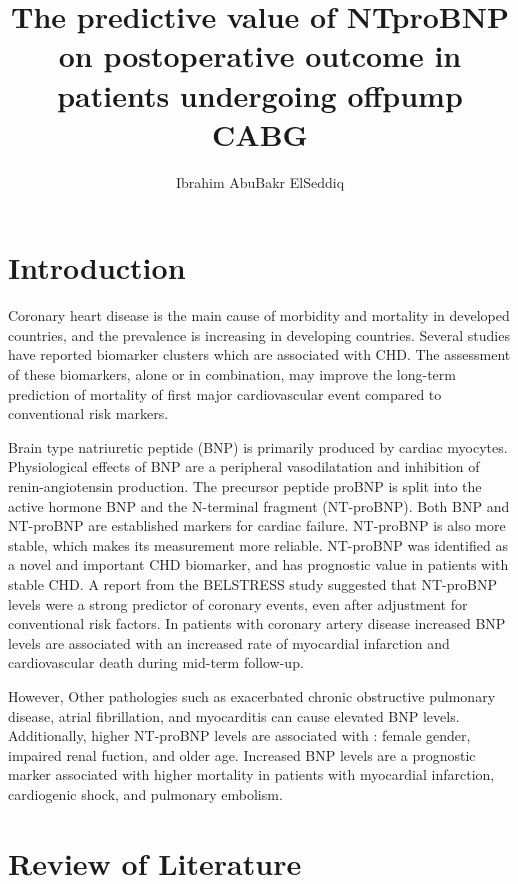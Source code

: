 \documentclass[14pt,a4paper,onecolumn]{article}
\author{Ibrahim AbuBakr ElSeddiq}
\title{The predictive value of NTproBNP on postoperative outcome in patients undergoing offpump CABG}
\begin{document}
\maketitle
\tableofcontents

\clearpage

\section{Introduction}

Coronary heart disease is the main cause of morbidity and mortality in developed countries, and the prevalence is increasing in developing countries.  Several studies have reported biomarker clusters which are associated with CHD.  The assessment of these biomarkers, alone or in combination, may improve the long-term prediction of mortality of first major cardiovascular event compared to conventional risk markers. \citep{Zetheliusetal2008}

Brain type natriuretic peptide (BNP) is primarily produced by cardiac myocytes. Physiological effects of BNP are a peripheral vasodilatation and inhibition of renin-angiotensin production. \citep{DanielsandMaisel2007} The precursor peptide proBNP is split into the active hormone BNP and the N-terminal fragment (NT-proBNP).  Both BNP and NT-proBNP are established markers for cardiac failure.  NT-proBNP is also more stable, which makes its measurement more reliable. \citep{Thay-Hsiungetal2013} NT-proBNP was identified as a novel and important CHD biomarker, and has prognostic value in patients with stable CHD. \citep{Kragelundetal2005} A report from the BELSTRESS study suggested that NT-proBNP levels were a strong predictor of coronary events, even after adjustment for conventional risk factors. \citep{DeSutteretal2005} In patients with coronary artery disease increased BNP levels are associated with an increased  rate of myocardial infarction and cardiovascular death during mid-term follow-up. \citep{Schabeletal2006}

However, Other pathologies such as exacerbated chronic obstructive pulmonary disease, atrial fibrillation, and myocarditis can cause elevated BNP levels. Additionally, higher NT-proBNP levels are associated with : female gender, impaired renal fuction, and older age.  Increased BNP levels are a prognostic marker associated with higher mortality in patients with myocardial infarction, cardiogenic shock, and pulmonary embolism. \citep{Rodseth2009}

\section{Review of Literature}
\end{document}

